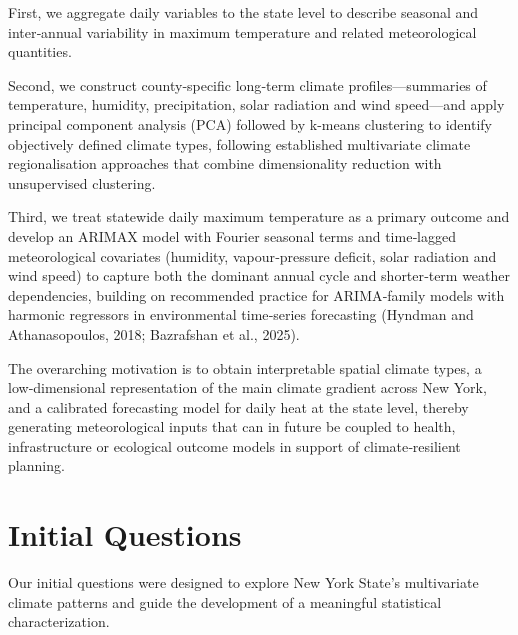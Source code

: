 \documentclass[
]{article}
\begin{document}
First, we aggregate daily variables to the state level to describe
seasonal and inter‑annual variability in maximum temperature and related
meteorological quantities.

Second, we construct county‑specific long‑term climate
profiles---summaries of temperature, humidity, precipitation, solar
radiation and wind speed---and apply principal component analysis (PCA)
followed by k-means clustering to identify objectively defined climate
types, following established multivariate climate regionalisation
approaches that combine dimensionality reduction with unsupervised
clustering.

Third, we treat statewide daily maximum temperature as a primary outcome
and develop an ARIMAX model with Fourier seasonal terms and time‑lagged
meteorological covariates (humidity, vapour‑pressure deficit, solar
radiation and wind speed) to capture both the dominant annual cycle and
shorter‑term weather dependencies, building on recommended practice for
ARIMA‑family models with harmonic regressors in environmental
time‑series forecasting (Hyndman and Athanasopoulos, 2018; Bazrafshan et
al., 2025).

The overarching motivation is to obtain interpretable spatial climate
types, a low‑dimensional representation of the main climate gradient
across New York, and a calibrated forecasting model for daily heat at
the state level, thereby generating meteorological inputs that can in
future be coupled to health, infrastructure or ecological outcome models
in support of climate‑resilient planning.

\section{\texorpdfstring{\textbf{Initial
Questions}}{Initial Questions}}\label{initial-questions}

Our initial questions were designed to explore New York State's
multivariate climate patterns and guide the development of a meaningful
statistical characterization.
\end{document}
